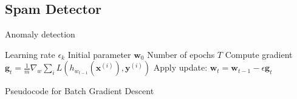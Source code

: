 \documentclass{beamer}
\begin{document}
\subsection{Spam Detector}

\begin{frame}{Anomaly detection}  
\begin{algorithm}[H]
	\begin{algorithmic}
		\REQUIRE Learning rate $\epsilon_k$
		\REQUIRE Initial parameter $\bm{w}_0$
		\REQUIRE Number of epochs $T$
		\STATE Compute gradient $\bm{g}_t=\frac{1}{m}\nabla_w\sum_i L(h_{w_{t-1}}(\bm{x}^{(i)}), \bm{y}^{(i)})$ 
		\STATE Apply update: $\bm{w}_t=\bm{w}_{t-1}-\epsilon \bm{g}_t$
		\ENDFOR
	\end{algorithmic}
	\caption{Pseudocode for Batch Gradient Descent}
	\label{alg:se}
\end{algorithm}
\end{frame}
\end{document}
